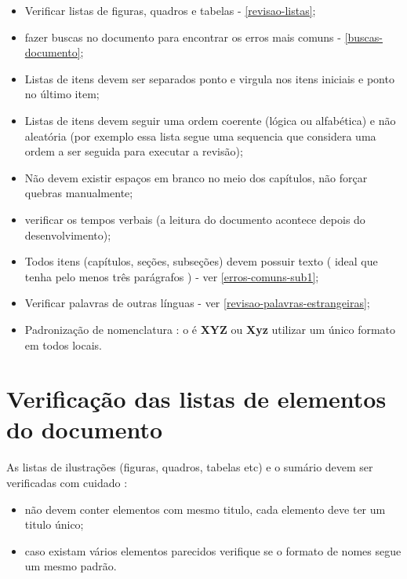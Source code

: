 \begin{itemize}
    \item Verificar listas de figuras, quadros e tabelas - \autoref{revisao-listas};

    \item fazer buscas no documento para encontrar os erros mais comuns - \autoref{buscas-documento};
    
    \item Listas de itens devem ser separados ponto e virgula nos itens iniciais e ponto no último item;
    
    \item Listas de itens devem seguir uma ordem coerente (lógica ou alfabética) e não aleatória (por exemplo essa lista segue uma sequencia que considera uma ordem a ser seguida para executar a revisão);
    
    \item Não devem existir espaços em branco no meio dos capítulos, não forçar quebras manualmente;
    
    \item verificar os tempos verbais (a leitura do documento acontece depois do desenvolvimento);
    
    \item Todos itens (capítulos, seções, subseções) devem possuir texto ( ideal que tenha pelo menos três parágrafos ) - ver \autoref{erros-comuns-sub1};

    \item Verificar palavras de outras línguas - ver \autoref{revisao-palavras-estrangeiras};
    
    \item Padronização de nomenclatura : o é \textbf{XYZ} ou \textbf{Xyz} utilizar um único formato em todos locais.
    
\end{itemize}

\section{Verificação das listas de elementos do documento}
\label{revisao-listas}

As listas de ilustrações (figuras, quadros, tabelas etc) e o sumário devem ser verificadas com cuidado :

\begin{itemize}
    \item não devem conter elementos com mesmo titulo, cada elemento deve ter um titulo único;
    
    \item caso existam vários elementos parecidos verifique se o formato de nomes segue um mesmo padrão.
    
\end{itemize}

